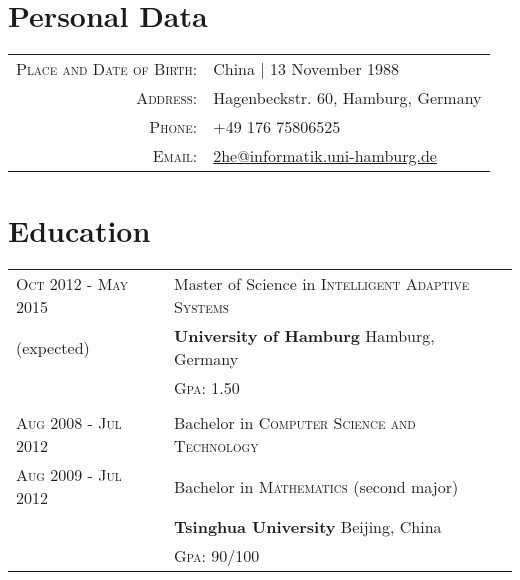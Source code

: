 \documentclass[a4paper,11pt]{article} %
\begin{document}
\pagestyle{empty} %


\par{\bigskip\par} %

\section{Personal Data}

\begin{tabular}{rl}
\textsc{Place and Date of Birth:} & China | 13 November 1988 \\
\textsc{Address:} & Hagenbeckstr. 60, Hamburg, Germany \\
\textsc{Phone:} & +49 176 75806525\\
\textsc{Email:} & \href{mailto:2he@informatik.uni-hamburg.de}{2he@informatik.uni-hamburg.de}
\end{tabular}


\section{Education}
\begin{tabular}{R{3.5cm}|p{11cm}}	
  \textsc{Oct 2012 - May 2015} & Master of Science in \textsc{Intelligent Adaptive Systems} \\
  {\footnotesize (expected)} & \textbf{University of Hamburg} \hfill Hamburg, Germany \\
  & \textsc{Gpa}: 1.50 \\
   \\


  \textsc{Aug 2008 - Jul 2012} & Bachelor in \textsc{Computer Science and Technology} \\
  \textsc{Aug 2009 - Jul 2012} & Bachelor in \textsc{Mathematics} (second major) \\
  & \textbf{Tsinghua University} \hfill Beijing, China \\
  & \textsc{Gpa}: 90/100 \\

\end{tabular}
\end{document}

